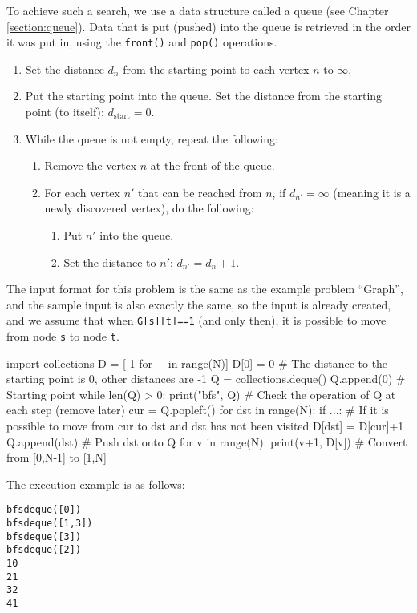 To achieve such a search, we use a data structure called a queue (see Chapter \ref{section:queue}). Data that is put (pushed) into the queue is retrieved in the order it was put in, using the \texttt{front()} and \texttt{pop()} operations.
\begin{enumerate}
\item Set the distance $d_n$ from the starting point to each vertex $n$ to $\infty$.
\item Put the starting point into the queue. Set the distance from the starting point (to itself): $d_{\text{start}}=0$.
\item While the queue is not empty, repeat the following:
  \begin{enumerate}
  \item Remove the vertex $n$ at the front of the queue.
  \item For each vertex $n'$ that can be reached from $n$, if $d_{n'}=\infty$ (meaning it is a newly discovered vertex), do the following:
    \begin{enumerate}
    \item Put $n'$ into the queue.
    \item Set the distance to $n'$: $d_{n'}=d_n+1$.
    \end{enumerate}
  \end{enumerate}
\end{enumerate}

The input format for this problem is the same as the example problem ``Graph'', and the sample input is also exactly the same, so the input is already created, and we assume that when \texttt{G[s][t]==1} (and only then), it is possible to move from node \texttt{s} to node \texttt{t}.

\begin{pybox}
import collections
D = [-1 for _ in range(N)]
D[0] = 0 # The distance to the starting point is 0, other distances are -1
Q = collections.deque()
Q.append(0)                     # Starting point
while len(Q) > 0:
    print("bfs", Q) # Check the operation of Q at each step (remove later)
    cur = Q.popleft()
    for dst in range(N):
        if ...: # If it is possible to move from cur to dst and dst has not been visited \label{code:bfspy:visit}
            D[dst] = D[cur]+1
            Q.append(dst) # Push dst onto Q
for v in range(N):
    print(v+1, D[v])        # Convert from [0,N-1] to [1,N]
\end{pybox}

The execution example is as follows:
\begin{alltt}
bfs deque([0])
bfs deque([1, 3])
bfs deque([3])
bfs deque([2])
1 0
2 1
3 2
4 1
\end{alltt}

